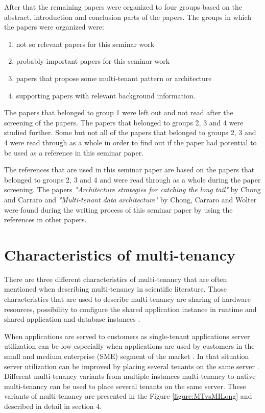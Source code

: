 \documentclass[conference]{sasmoota2017}
\begin{document}
After that the remaining papers were organized to four groups based on the abstract, introduction and conclusion parts of the papers. The groups in which the papers were organized were: 
\begin{enumerate}
\item not so relevant papers for this seminar work
\item probably important papers for this seminar work
\item papers that propose some multi-tenant pattern or architecture
\item supporting papers with relevant background information.
\end{enumerate}
The papers that belonged to group 1 were left out and not read after the screening of the papers. The papers that belonged to groups 2, 3 and 4 were studied further. Some but not all of the papers that belonged to groups 2, 3 and 4 were read through as a whole in order to find out if the paper had potential to be used as a reference in this seminar paper. 

The references that are used in this seminar paper are based on the papers that belonged to groups 2, 3 and 4 and were read through as a whole during the paper screening. The papers \textit{"Architecture strategies for catching the long tail"} by Chong and Carraro \cite{Carraro:2006:ArchitectureLongTail} and \textit{"Multi-tenant data architecture"} by Chong, Carraro and Wolter \cite{Chong:2006:MultiTenantDataArchitecture} were found during the writing process of this seminar paper by using the references in other papers.  


\section{Characteristics of multi-tenancy}

There are three different characteristics of multi-tenancy that are often mentioned when describing multi-tenancy in scientific literature. Those characteristics that are used to describe multi-tenancy are sharing of hardware resources, possibility to configure the shared application instance in runtime and shared application and database instances \cite{Bezemer:2010:MaintenanceDream}. 

When applications are served to customers as single-tenant applications server utilization can be low especially when applications are used by customers in the small and medium enterprise (SME) segment of the market \cite{Bezemer:2010:MaintenanceDream}. In that situation server utilization can be improved by placing several tenants on the same server \cite{Bezemer:2010:MaintenanceDream}. Different multi-tenancy variants from multiple instances multi-tenancy to native multi-tenancy can be used to place several tenants on the same server. These variants of multi-tenancy are presented in the Figure \ref{figure:MTvsMILong} and described in detail in section 4.
\end{document}
